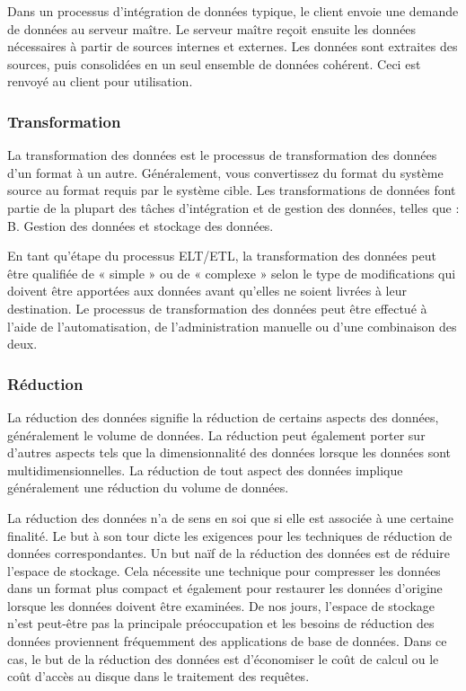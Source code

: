         Dans un processus d'intégration de données typique, le client envoie une demande de données au serveur maître. Le serveur maître reçoit ensuite les données nécessaires à partir de sources internes et externes. Les données sont extraites des sources, puis consolidées en un seul ensemble de données cohérent. Ceci est renvoyé au client pour utilisation.
        \subsubsection{Transformation}
        La transformation des données est le processus de transformation des données d'un format à un autre. Généralement, vous convertissez du format du système source au format requis par le système cible. Les transformations de  données font partie de la plupart des tâches d'intégration et de gestion des données, telles que : B. Gestion des données et stockage des données. 

        En tant qu'étape du processus ELT/ETL, la transformation des données peut être qualifiée de « simple » ou de « complexe » selon le type de modifications qui doivent être apportées aux données avant qu'elles ne soient livrées à leur destination. Le processus de transformation des données peut être effectué à l'aide de l'automatisation, de l'administration manuelle ou d'une combinaison des deux.

        \subsubsection{Réduction}
        La réduction des données signifie la réduction de certains aspects des données, généralement le volume de données. La réduction peut également porter sur d'autres aspects tels que la dimensionnalité des données lorsque les données sont multidimensionnelles. La réduction de tout aspect des données implique généralement une réduction du volume de données.

        La réduction des données n'a de sens en soi que si elle est associée à une certaine finalité. Le but à son tour dicte les exigences pour les techniques de réduction de données correspondantes. Un but naïf de la réduction des données est de réduire l'espace de stockage. Cela nécessite une technique pour compresser les données dans un format plus compact et également pour restaurer les données d'origine lorsque les données doivent être examinées. De nos jours, l'espace de stockage n'est peut-être pas la principale préoccupation et les besoins de réduction des données proviennent fréquemment des applications de base de données. Dans ce cas, le but de la réduction des données est d'économiser le coût de calcul ou le coût d'accès au disque dans le traitement des requêtes.
